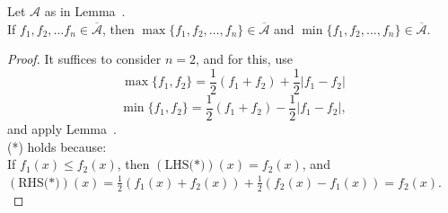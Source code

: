 \begin{lemma}[2]
	\label{lem:7.32b}
	Let $\mathscr{A}$ as in Lemma~.\\
	If $f_{1},f_{2},\ldots f_{n} \in \overline{\mathscr{A}}$, then $\max\{f_{1},f_{2},\ldots ,f_{n}\}  \in \overline{\mathscr{A}}$ and $\min\{f_{1},f_{2},\ldots ,f_{n}\} \in \overline{\mathscr{A}}$.
	\begin{proof}
		It suffices to consider $n=2$, and for this,
		use
		\begin{equation*}
			\max\{f_{1},f_{2}\}=\frac{1}{2}(f_{1}+f_{2})+\frac{1}{2} \left|f_{1}-f_{2}\right|\tag{*}
		\end{equation*}
		\begin{equation*}
			\min\{f_{1},f_{2}\}=\frac{1}{2}(f_{1}+f_{2})-\frac{1}{2} \left|f_{1}-f_{2}\right|
			,\end{equation*}
		and apply Lemma~.\\
		(*) holds because:\\
		If $f_{1}(x)\le f_{2}(x)$, then $(\text{LHS(*)})(x)=f_{2}(x)$, and $(\text{RHS(*)})(x)=\frac{1}{2}(f_{1}(x)+f_{2}(x))+\frac{1}{2}(f_{2}(x)-f_{1}(x))=f_{2}(x)$.\\
	\end{proof}
\end{lemma}
